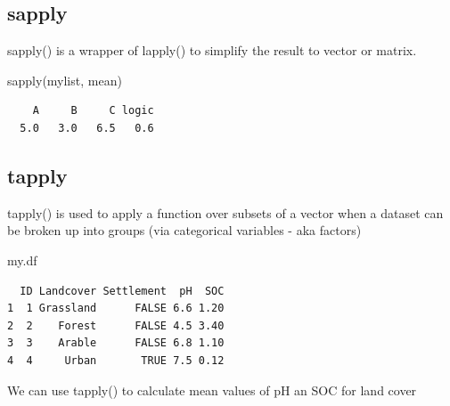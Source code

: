 \documentclass[
  letterpaper,
  DIV=11,
  numbers=noendperiod]{scrreprt}
\newenvironment{Shaded}{\begin{snugshade}}{\end{snugshade}}
\newcommand{\ControlFlowTok}[1]{\textcolor[rgb]{0.00,0.23,0.31}{#1}}
\newcommand{\DecValTok}[1]{\textcolor[rgb]{0.68,0.00,0.00}{#1}}
\newcommand{\FunctionTok}[1]{\textcolor[rgb]{0.28,0.35,0.67}{#1}}
\newcommand{\NormalTok}[1]{\textcolor[rgb]{0.00,0.23,0.31}{#1}}
\newcommand{\SpecialCharTok}[1]{\textcolor[rgb]{0.37,0.37,0.37}{#1}}
\begin{document}
\hypertarget{sapply}{%
\subsection{sapply}\label{sapply}}

sapply() is a wrapper of lapply() to simplify the result to vector or
matrix.

\begin{Shaded}
\begin{Highlighting}[]
\FunctionTok{sapply}\NormalTok{(mylist, mean)}
\end{Highlighting}
\end{Shaded}

\begin{verbatim}
    A     B     C logic 
  5.0   3.0   6.5   0.6 
\end{verbatim}

\hypertarget{tapply}{%
\subsection{tapply}\label{tapply}}

tapply() is used to apply a function over subsets of a vector when a
dataset can be broken up into groups (via categorical variables - aka
factors)

\begin{Shaded}
\begin{Highlighting}[]
\NormalTok{my.df}
\end{Highlighting}
\end{Shaded}

\begin{verbatim}
  ID Landcover Settlement  pH  SOC
1  1 Grassland      FALSE 6.6 1.20
2  2    Forest      FALSE 4.5 3.40
3  3    Arable      FALSE 6.8 1.10
4  4     Urban       TRUE 7.5 0.12
\end{verbatim}

We can use tapply() to calculate mean values of pH an SOC for land cover

\begin{Shaded}
\end{Shaded}
\end{document}
